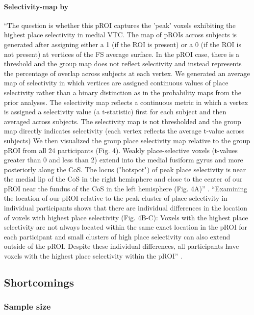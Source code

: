 \paragraph{Selectivity-map by \citet{weiner2018defining}}
%
``The question is whether this pROI captures the 'peak' voxels exhibiting the
highest place selectivity in medial VTC.
%
The map of pROIs across subjects is generated after assigning either a 1 (if the
ROI is present) or a 0 (if the ROI is not present) at vertices of the FS average
surface.
%
In the pROI case, there is a threshold and the group map does not reflect
selectivity and instead represents the percentage of overlap across subjects at
each vertex.
%
We generated an average map of selectivity in which vertices are assigned
continuous values of place selectivity rather than a binary distinction as in
the probability maps from the prior analyses.
%
The selectivity map reflects a continuous metric in which a vertex is assigned a
selectivity value (a t-statistic) first for each subject and then averaged
across subjects.
%
The selectivity map is not thresholded and the group map directly indicates
selectivity (each vertex reflects the average t-value across subjects)
%
We then visualized the group place selectivity map relative to the group pROI
from all 24 participants (Fig. 4).
%
Weakly place-selective voxels (t-values greater than 0 and less than 2) extend
into the medial fusiform gyrus and more posteriorly along the CoS.
%
The locus ("hotspot") of peak place selectivity is near the medial lip of the
CoS in the right hemisphere and close to the center of our pROI near the fundus
of the CoS in the left hemisphere (Fig. 4A)'' \citep{weiner2018defining}.
%
``Examining the location of our pROI relative to the peak cluster of place
selectivity in individual participants shows that there are individual
differences in the location of voxels with highest place selectivity (Fig.
4B-C):
%
Voxels with the highest place selectivity are not always located within the same
exact location in the pROI for each participant and small clusters of high place
selectivity can also extend outside of the pROI.
%
Despite these individual differences, all participants have voxels with the
highest place selectivity within the pROI''
\citep{weiner2018defining}.


\subsection{Shortcomings}


\subsubsection{Sample size}


